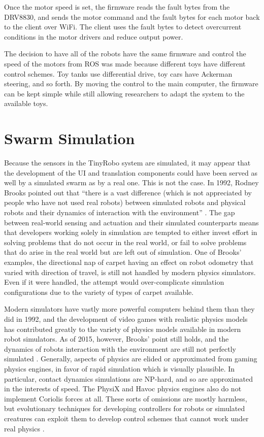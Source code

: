 Once the motor speed is set, the firmware reads the fault bytes from the DRV8830, and sends the motor command and the fault bytes for each motor back to the client over WiFi. 
The client uses the fault bytes to detect overcurrent conditions in the motor drivers and reduce output power. 

The decision to have all of the robots have the same firmware and control the speed of the motors from ROS was made because different toys have different control schemes. 
Toy tanks use differential drive, toy cars have Ackerman steering, and so forth. 
By moving the control to the main computer, the firmware can be kept simple while still allowing researchers to adapt the system to the available toys.

\section{Swarm Simulation}

Because the sensors in the TinyRobo system are simulated, it may appear that the development of the UI and translation components could have been served as well by a simulated swarm as by a real one. 
This is not the case. 
In 1992, Rodney Brooks pointed out that ``there is a vast difference (which is not appreciated by people who have not used real robots) between simulated robots and physical robots and their dynamics of interaction with the environment'' \citep{brooks1992artificial}. 
The gap between real-world sensing and actuation and their simulated counterparts means that developers working solely in simulation are tempted to either invest effort in solving problems that do not occur in the real world, or fail to solve problems that do arise in the real world but are left out of simulation. 
One of Brooks' examples, the directional nap of carpet having an effect on robot odometry that varied with direction of travel, is still not handled by modern physics simulators. 
Even if it were handled, the attempt would over-complicate simulation configurations due to the variety of types of carpet available. 

Modern simulators have vastly more powerful computers behind them than they did in 1992, and the development of video games with realistic physics models has contributed greatly to the variety of physics models available in modern robot simulators. 
As of 2015, however, Brooks' point still holds, and the dynamics of robots interaction with the environment are still not perfectly simulated \citep{erez2015simulation}.
Generally, aspects of physics are elided or approximated from gaming physics engines, in favor of rapid simulation which is visually plausible. 
In particular, contact dynamics simulations are NP-hard, and so are approximated in the interests of speed. 
The PhysiX and Havoc physics engines also do not implement Coriolis forces at all.
These sorts of omissions are mostly harmless, but evolutionary techniques for developing controllers for robots or simulated creatures can exploit them to develop control schemes that cannot work under real physics \citep{Brooks2000}. 

